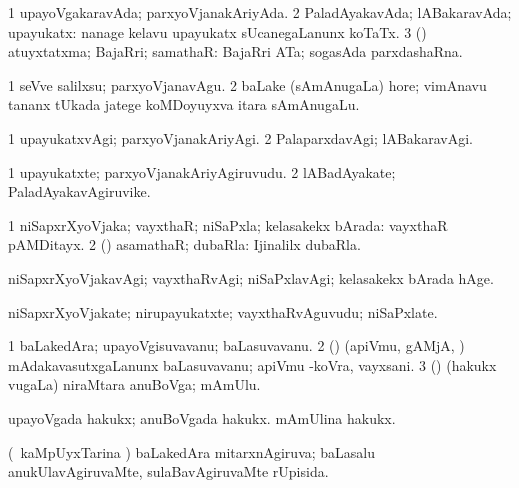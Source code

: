 \bentry
{} 
\gl{\gu}
\expl{}
\bmng
\bnum
\num{1} upayoVgakaravAda; parxyoVjanakAriyAda. 
\num{2} PaladAyakavAda; lABakaravAda; upayukatx:  nanage kelavu upayukatx sUcanegaLanunx koTaTx. 
\num{3} (\AmA) atuyxtatxma; BajaRri; samathaR:  BajaRri ATa; sogasAda parxdashaRna. 
\enum
\emng

\noindent 
\gl{\pagu}
\expl{}
\bmng
\bnum
\num{1}  seVve salilxsu; parxyoVjanavAgu. 
\num{2}  baLake (sAmAnugaLa) hore; vimAnavu tananx tUkada jatege koMDoyuyxva itara sAmAnugaLu. 
\enum
\emng
\eentry

\bentry
{} 
\gl{\kirxvi}
\expl{}
\bmng
\bnum
\num{1} upayukatxvAgi; parxyoVjanakAriyAgi. 
\num{2} PalaparxdavAgi; lABakaravAgi. 
\enum
\emng
\eentry

\bentry
{} 
\gl{\nA}
\expl{}
\bmng
\bnum
\num{1} upayukatxte; parxyoVjanakAriyAgiruvudu. 
\num{2} lABadAyakate; PaladAyakavAgiruvike. 
\enum
\emng
\eentry

\bentry
{} 
\gl{\gu}
\bmng
\bnum
\num{1} niSapxrXyoVjaka; vayxthaR; niSaPxla; kelasakekx bArada:  vayxthaR pAMDitayx. 
\num{2} (\AmA) asamathaR; dubaRla:  Ijinalilx dubaRla. 
\enum
\emng
\eentry

\bentry
{} 
\gl{\kirxvi}
\expl{}
\bmng
niSapxrXyoVjakavAgi; vayxthaRvAgi; niSaPxlavAgi; kelasakekx bArada hAge. 
\emng
\eentry

\bentry
{} 
\gl{\nA}
\expl{}
\bmng
niSapxrXyoVjakate; nirupayukatxte; vayxthaRvAguvudu; niSaPxlate. 
\emng
\eentry

\bentry
{} 
\gl{\nA}
\bmng
\bnum
\num{1} baLakedAra; upayoVgisuvavanu; baLasuvavanu. 
\num{2} (\AmA) (apiVmu, gAMjA, \mo) mAdakavasutxgaLanunx baLasuvavanu; apiVmu -koVra, vayxsani. 
\num{3} (\nAyxshA) (hakukx \mo vugaLa) niraMtara anuBoVga; mAmUlu. 
\enum
\emng

\noindent
\gl{\pagu}
\expl{}
\bmng
{} 
\banum
{} upayoVgada hakukx; anuBoVgada hakukx. 
 mAmUlina hakukx. 
\eanum
\emng
\eentry

\bentry
{} 
\gl{\gu}
\expl{}
\bmng
(\kanmu\ kaMpUyxTarina \vi) baLakedAra mitarxnAgiruva; baLasalu anukUlavAgiruvaMte, sulaBavAgiruvaMte rUpisida. 
\emng
\eentry

